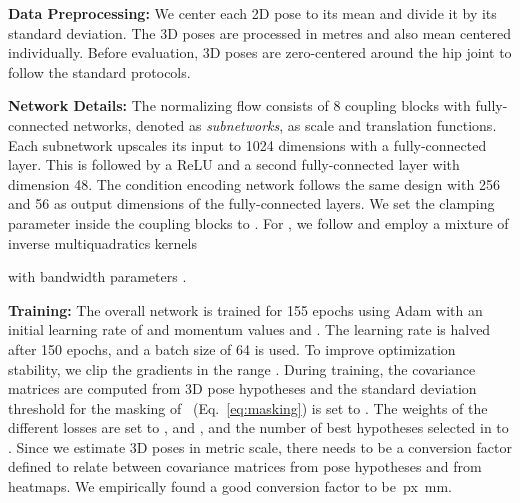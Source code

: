 \documentclass[10pt,twocolumn,letterpaper]{article}
\begin{document}
\textbf{Data Preprocessing:} We center each 2D pose to its mean and divide it by its standard deviation.
The 3D poses are processed in metres and also mean centered individually.
Before evaluation, 3D poses are zero-centered around the hip joint to follow the standard protocols.

\textbf{Network Details:}
The normalizing flow consists of 8 coupling blocks with fully-connected networks, denoted as \textit{subnetworks}, as scale and translation functions.
Each subnetwork upscales its input to 1024 dimensions with a fully-connected layer.
This is followed by a ReLU and a second fully-connected layer with dimension 48.
The condition encoding network  follows the same design with 256 and 56 as output dimensions of the fully-connected layers. 
We set the clamping parameter inside the coupling blocks to .
For , we follow \cite{ArdizzoneINN} and employ a mixture of inverse multiquadratics kernels

with bandwidth parameters .

\textbf{Training:}
The overall network is trained for 155 epochs using Adam \cite{Adam_KingmaB14} with an initial learning rate of  and momentum values  and .
The learning rate is halved after 150 epochs, and a batch size of 64 is used.
To improve optimization stability, we clip the gradients in the range .
During training, the covariance matrices are computed from  3D pose hypotheses and the standard deviation threshold for the masking of ~(Eq.~\ref{eq:masking}) is set to .
The weights of the different losses are set to ,  and  , and the number of best hypotheses selected in  to .
Since we estimate 3D poses in metric scale, there needs to be a conversion factor defined to relate between covariance matrices from pose hypotheses and from heatmaps.
We empirically found a good conversion factor to be \,px \,mm.
\end{document}
